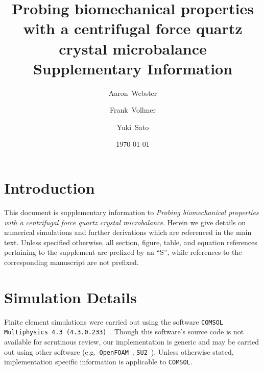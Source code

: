 \documentclass[floatfix,superscriptaddress,a4paper,notitlepage]{revtex4-1}
\newcommand{\comsol}{\texttt{COMSOL}}
\newcommand{\todo}[1]{%
 \textcolor{tangoorange}{#1}
}
\begin{document}
\title{Probing biomechanical properties with a centrifugal force quartz
  crystal microbalance\\ Supplementary Information}
\author{Aaron~Webster}
\author{Frank~Vollmer}
\author{Yuki~Sato}
\date{\today}


\maketitle

\tableofcontents

\section{Introduction}
This document is supplementary information to
\textit{Probing biomechanical properties with a centrifugal force quartz
  crystal microbalance}.  Herein we give details on numerical simulations and
further derivations which are referenced in the main text.  Unless
specified otherwise, all section, figure, table, and equation references
pertaining to the supplement are prefixed by an ``S'', while references to
the corresponding manuscript are not prefixed.

\section{Simulation Details}
Finite element simulations were carried out using the software
\texttt{COMSOL Multiphysics 4.3 (4.3.0.233)}~\cite{multiphysics1994comsol}.
Though this software's source code is not available for
scrutinous review, our implementation is generic and may be carried out
using other software (e.g.\ \texttt{OpenFOAM}~\cite{jasak2007openfoam},
\texttt{SU2}~\cite{palacios2013stanford}).  Unless otherwise stated,
implementation specific information is applicable to \comsol.
\end{document}
